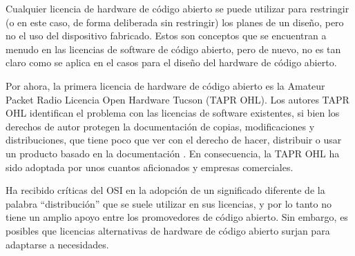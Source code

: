 

Cualquier licencia de hardware de código abierto se puede utilizar
para restringir (o en este caso, de forma deliberada sin restringir)
los planes de un diseño, pero no el uso del dispositivo
fabricado. Estos son conceptos que se encuentran a menudo en las
licencias de software de código abierto, pero de nuevo, no es tan
claro como se aplica en el casos para el diseño del hardware de código
abierto.

Por ahora, la primera licencia de hardware de código abierto es la
Amateur Packet Radio Licencia Open Hardware Tucson (TAPR OHL). Los
autores TAPR OHL identifican el problema con las licencias de software
existentes, si bien los derechos de autor protegen la documentación de
copias, modificaciones y distribuciones, que tiene poco que ver con el
derecho de hacer, distribuir o usar un producto basado en la
documentación \cite{Etiqueta12}. En consecuencia, la TAPR OHL ha sido
adoptada por unos cuantos aficionados y empresas comerciales.



Ha recibido críticas del OSI en la adopción de un significado
diferente de la palabra ``distribución'' que se suele utilizar en sus
licencias, y por lo tanto no tiene un amplio apoyo entre los
promovedores de código abierto\cite{Etiqueta13}. Sin embargo, es
posibles que licencias alternativas de hardware de código abierto
surjan para adaptarse a necesidades.

